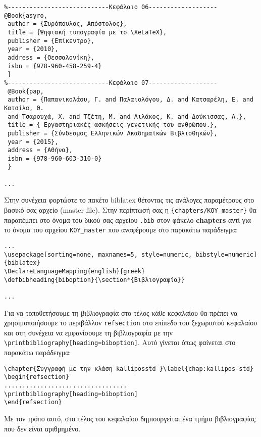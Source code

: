 \begin{refsection}
\begin{verbatim}
%----------------------------Κεφάλαιο 06-------------------
@Book{asyro,
 author = {Συρόπουλος, Απόστολος},
 title = {Ψηφιακή τυπογραφία με το \XeLaTeX},
 publisher = {Επίκεντρο},
 year = {2010},
 address = {Θεσσαλονίκη},
 isbn = {978-960-458-259-4}
 }
%----------------------------Κεφάλαιο 07-------------------
 @Book{pap,
 author = {Παπανικολάου, Γ. and Παλαιολόγου, Δ. and Κατσαρέλη, Ε. and Κατσίλα, Θ.
 and Τσαρουχά, Χ. and Τζέτη, Μ. and Λιλάκος, Κ. and Δούκισσας, Λ.},
 title = { Εργαστηριακές ασκήσεις γενετικής του ανθρώπου.},
 publisher = {Σύνδεσμος Ελληνικών Ακαδημαϊκών Βιβλιοθηκών},
 year = {2015},
 address = {Αθήνα},
 isbn = {978-960-603-310-0}
 }

...
\end{verbatim}

Στην συνέχεια φορτώστε το πακέτο biblatex θέτοντας τις ανάλογες παραμέτρους στο βασικό σας αρχείο
(master file). Στην περίπτωσή σας η \verb|{chapters/KOY_master}| θα παραπέμπει στο όνομα του
δικού σας αρχείου \texttt{.bib} στον φάκελο \textbf{chapters} αντί για το όνομα του αρχείου \verb|KOY_master| που αναφέρουμε στο παρακάτω παράδειγμα:
\begin{verbatim}
...
\usepackage[sorting=none, maxnames=5, style=numeric, bibstyle=numeric]{biblatex}
\DeclareLanguageMapping{english}{greek}
\defbibheading{biboption}{\section*{Βιβλιογραφία}}

...
\end{verbatim}

Για να τοποθετήσουμε τη βιβλιογραφία στο τέλος κάθε κεφαλαίου θα πρέπει να χρησιμοποιήσουμε το περιβάλλον
\verb|refsection| στο επίπεδο του ξεχωριστού κεφαλαίου και στη συνέχεια να εμφανίσουμε τη βιβλιογραφία
με την \verb|\printbibliography[heading=biboption]|. Αυτό γίνεται όπως φαίνεται στο παρακάτω παράδειγμα:
\begin{verbatim}
\chapter{Συγγραφή με την κλάση kalliposstd }\label{chap:kallipos-std}
\begin{refsection}
..................................
\printbibliography[heading=biboption]
\end{refsection}
\end{verbatim}

Με τον τρόπο αυτό, στο τέλος του κεφαλαίου δημιουργείται ένα τμήμα βιβλιογραφίας που δεν είναι αριθμημένο.


\end{refsection}
